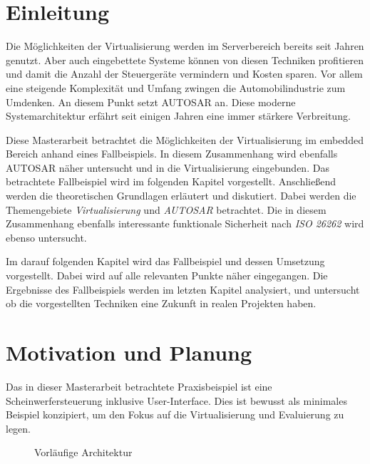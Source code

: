 \documentclass[
  a4paper,					    %
  twoside,
  DIV=calc,     				%
  bibliography=totoc,
  cleardoublepage=empty,
  ngerman,     					%
  final       					%
]{scrbook}
\begin{document}
\mainmatter
\chapter{Einleitung}
\label{sec:Einleitung}
Die Möglichkeiten der Virtualisierung werden im Serverbereich bereits seit Jahren genutzt. Aber auch eingebettete Systeme können von diesen Techniken profitieren und damit die Anzahl der Steuergeräte vermindern und Kosten sparen. Vor allem eine steigende Komplexität und Umfang zwingen die Automobilindustrie zum Umdenken. An diesem Punkt setzt AUTOSAR an. Diese moderne Systemarchitektur erfährt seit einigen Jahren eine immer stärkere Verbreitung. 

Diese Masterarbeit betrachtet die Möglichkeiten der Virtualisierung im embedded Bereich anhand eines Fallbeispiels. In diesem Zusammenhang wird ebenfalls AUTOSAR näher untersucht und in die Virtualisierung eingebunden. Das betrachtete Fallbeispiel wird im folgenden Kapitel vorgestellt. Anschließend werden die theoretischen Grundlagen erläutert und diskutiert. Dabei werden die Themengebiete \emph{Virtualisierung} und \emph{AUTOSAR} betrachtet. Die in diesem Zusammenhang ebenfalls interessante funktionale Sicherheit nach \emph{ISO 26262} wird ebenso untersucht.

Im darauf folgenden Kapitel wird das Fallbeispiel und dessen Umsetzung vorgestellt. Dabei wird auf alle relevanten Punkte näher eingegangen. Die Ergebnisse des Fallbeispiels werden im letzten Kapitel analysiert, und untersucht ob die vorgestellten Techniken eine Zukunft in realen Projekten haben.




\chapter{Motivation und Planung}
\label{sec:MotivationPlanung}
Das in dieser Masterarbeit betrachtete Praxisbeispiel ist eine Scheinwerfersteuerung inklusive User-Interface. Dies ist bewusst als minimales Beispiel konzipiert, um den Fokus auf die Virtualisierung und Evaluierung zu legen.

\begin{figure}[ht]
    \centering
    
    \caption{Vorläufige Architektur}
    \label{fig:arch_begin}
\end{figure}
\end{document}
